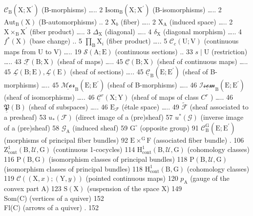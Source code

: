 \backmatter


\(\mathcal{C}_{\mathrm{B}}(\mathrm{X};\mathrm{X}^{\prime})\) (B-morphisms) \ldots.. 2 \(\mathrm{Isom}_{\mathrm{B}}(\mathrm{X};\mathrm{X}^{\prime})\) (B-isomorphisms) \ldots.. 2 \(\mathrm{Aut}_{\mathrm{B}}(\mathrm{X})\) (B-automorphisms) .. 2 \(\mathrm{X}_{b}\) (fiber) \ldots.. 2 \(\mathrm{X}_{\mathrm{A}}\) (induced space) \ldots.. 2 \(\mathrm{X} \times_{\mathrm{B}} \mathrm{X}^{\prime}\) (fiber product) \ldots.. 3 \(\Delta_{\mathrm{X}}\) (diagonal) \ldots.. 4 \(\delta_{\mathrm{X}}\) (diagonal morphism) \ldots.. 4 \(f^{*}(\mathrm{X})\) (base change) .. 5 \(\prod_{\mathrm{B}} \mathrm{X}_{i}\) (fiber product) \ldots.. 5 \(\mathcal{C}_{c}(\mathrm{U};\mathrm{V})\) (continuous maps from U to V) \ldots.. 19 \(\mathcal{S}(\mathrm{A};\mathrm{E})\) (continuous sections) .. 33 \(s \mid \mathrm{U}\) (restriction) \ldots.. 43 \(\underline{\mathcal{F}}(\mathrm{B};\mathrm{X})\) (sheaf of maps) \ldots.. 45 \(\underline{\mathcal{C}}(\mathrm{B};\mathrm{X})\) (sheaf of continuous maps) \ldots.. 45 \(\underline{\mathcal{L}}(\mathrm{B};\mathrm{E}), \underline{\mathcal{L}}(\mathrm{E})\) (sheaf of sections) \ldots.. 45 \(\underline{\mathcal{C}}_{\mathrm{B}}(\mathrm{E};\mathrm{E}^{\prime})\) (sheaf of B-morphisms) \ldots.. 45 \(\underline{\mathcal{Mor}}_{\mathrm{B}}(\mathrm{E};\mathrm{E}^{\prime})\) (sheaf of B-morphisms) \ldots.. 46 \(\underline{\mathcal{Isom}}_{\mathrm{B}}(\mathrm{E};\mathrm{E}^{\prime})\) (sheaf of isomorphisms) \ldots.. 46 \(\underline{\mathcal{C}}^{r}(\mathrm{X};\mathrm{Y})\) (sheaf of maps of class \(C^{r}\) ) \ldots.. 46 \(\underline{\mathfrak{P}}(\mathrm{B})\) (sheaf of subspaces) \ldots.. 46 \(\mathrm{E}_{\mathcal{F}}\) (étale space) \ldots.. 49 \(\widetilde{\mathcal{F}}\) (sheaf associated to a presheaf) 53 \(u_{*}(\mathcal{F})\) (direct image of a (pre)sheaf) 57 \(u^{*}(\mathcal{G})\) (inverse image of a (pre)sheaf) 58 \(\mathcal{G}_{\mathrm{A}}\) (induced sheaf) 59 \(\mathrm{G}^{\circ}\) (opposite group) 91 \(\mathcal{C}_{\mathrm{B}}^{\mathrm{G}}(\mathrm{E};\mathrm{E}^{\prime})\) (morphisms of principal fiber bundles) 92 \(\mathrm{E} \times^{\mathrm{G}} \mathrm{F}\) (associated fiber bundle) . 106 \(\mathrm{Z}_{\mathrm{cont}}^{1}(\mathrm{B},\mathcal{U},\mathrm{G})\) (continuous 1-cocycles) 114 \(\mathrm{H}_{\mathrm{cont}}^{1}(\mathrm{B},\mathcal{U},\mathrm{G})\) (cohomology classes) 116 \(\mathrm{P}(\mathrm{B},\mathrm{G})\) (isomorphism classes of principal bundles) 118 \(\mathrm{P}(\mathrm{B},\mathcal{U},\mathrm{G})\) (isomorphism classes of principal bundles) 118 \(\mathrm{H}_{\mathrm{cont}}^{1}(\mathrm{B},\mathrm{G})\) (cohomology classes) 119 \(\mathcal{C}((\mathrm{X},x);(\mathrm{Y},y))\) (pointed continuous maps) 120 \(p_{\mathrm{A}}\) (gauge of the convex part A) 123 \(\mathrm{S}(\mathrm{X})\) (suspension of the space X) 149\\
Som(C) (vertices of a quiver) 152\\
Fl(C) (arrows of a quiver) . 152

